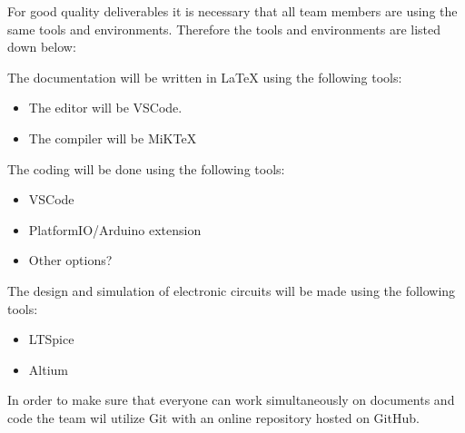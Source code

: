 For good quality deliverables it is necessary that all team members are using the same tools and environments. Therefore the tools and environments are listed down below:

The documentation will be written in LaTeX using the following tools:
\begin{itemize}
    \setlength\itemsep{-0.3em}
    \item The editor will be VSCode.
    \item The compiler will be MiKTeX
\end{itemize}

The coding will be done using the following tools:
\begin{itemize}
    \item VSCode
    \item PlatformIO/Arduino extension
    \item Other options?
\end{itemize}

The design and simulation of electronic circuits will be made using the following tools:
\begin{itemize}
    \item LTSpice
    \item Altium
\end{itemize}

In order to make sure that everyone can work simultaneously on documents and code the team wil utilize Git with an online repository hosted on GitHub.